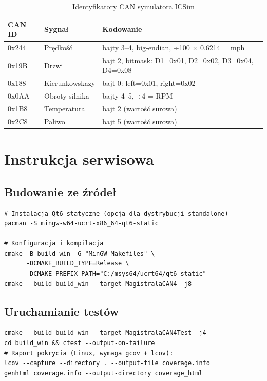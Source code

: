 \documentclass[12pt, a4paper]{article}
\begin{document}
\begin{table}[H]
\caption{Identyfikatory CAN symulatora ICSim}
\label{tab:icsim}
\centering
\small
\begin{tabular}{lll}
\toprule
\textbf{CAN ID} & \textbf{Sygnał} & \textbf{Kodowanie} \\
\midrule
0x244 & Prędkość       & bajty 3--4, big-endian, $\div$100 $\times$ 0.6214 = mph \\
0x19B & Drzwi          & bajt 2, bitmask: D1=0x01, D2=0x02, D3=0x04, D4=0x08 \\
0x188 & Kierunkowskazy & bajt 0: left=0x01, right=0x02 \\
0x0AA & Obroty silnika & bajty 4--5, $\div$4 = RPM \\
0x1B8 & Temperatura    & bajt 2 (wartość surowa) \\
0x2C8 & Paliwo         & bajt 5 (wartość surowa) \\
\bottomrule
\end{tabular}
\end{table}

\section{Instrukcja serwisowa}

\subsection{Budowanie ze źródeł}

\begin{lstlisting}[style=cpp, caption={Budowanie projektu (Windows, MSYS2 UCRT64)}]
# Instalacja Qt6 statyczne (opcja dla dystrybucji standalone)
pacman -S mingw-w64-ucrt-x86_64-qt6-static

# Konfiguracja i kompilacja
cmake -B build_win -G "MinGW Makefiles" \
      -DCMAKE_BUILD_TYPE=Release \
      -DCMAKE_PREFIX_PATH="C:/msys64/ucrt64/qt6-static"
cmake --build build_win --target MagistralaCAN4 -j8
\end{lstlisting}

\subsection{Uruchamianie testów}

\begin{lstlisting}[style=cpp, caption={Uruchomienie testow jednostkowych}]
cmake --build build_win --target MagistralaCAN4Test -j4
cd build_win && ctest --output-on-failure
# Raport pokrycia (Linux, wymaga gcov + lcov):
lcov --capture --directory . --output-file coverage.info
genhtml coverage.info --output-directory coverage_html
\end{lstlisting}
\end{document}
